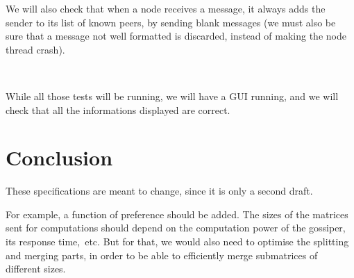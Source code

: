 \documentclass[a4paper,12pt]{article}
\begin{document}
    We will also check that when a node receives a message, it always adds the sender to its list of known peers, by sending blank messages (we must also be sure that a message not well formatted is discarded, instead of making the node thread crash).

~~

    While all those tests will be running, we will have a GUI running, and we will check that all the informations displayed are correct.

    \section{Conclusion}
    These specifications are meant to change, since it is only a second draft.

    For example, a function of preference should be added. The sizes of the matrices sent for computations should depend on the computation power of the gossiper, its response time,~etc. But for that, we would also need to optimise the splitting and merging parts, in order to be able to efficiently merge submatrices of different sizes.
\end{document}
